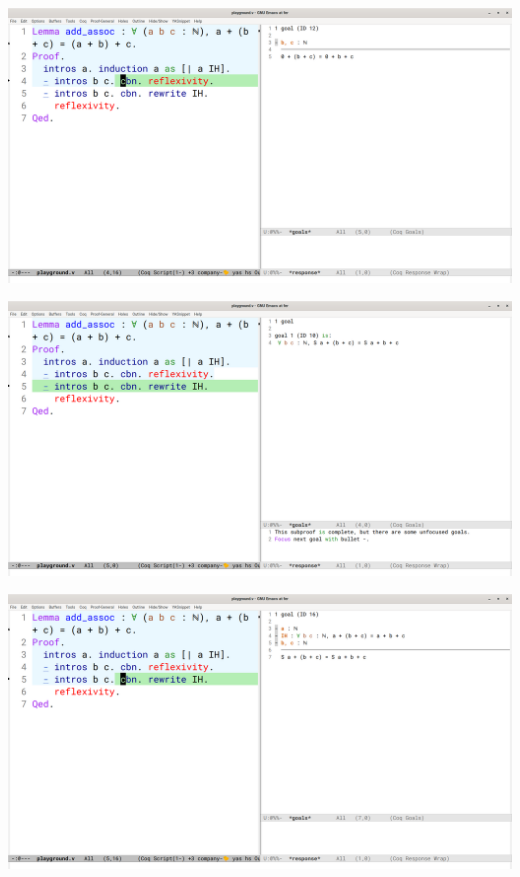 \documentclass{beamer}
\begin{document}
\begin{frame}[plain]
  \includegraphics[width=\linewidth]{slika7}
\end{frame}\addtocounter{framenumber}{-1}
\begin{frame}[plain]
  \includegraphics[width=\linewidth]{slika9}
\end{frame}\addtocounter{framenumber}{-1}
\begin{frame}[plain]
  \includegraphics[width=\linewidth]{slika11}
\end{frame}\addtocounter{framenumber}{-1}
\end{document}
